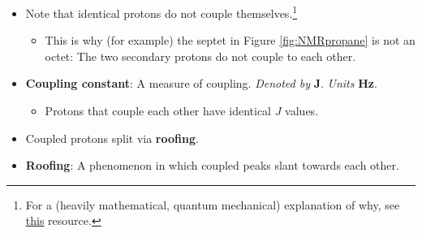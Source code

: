 \documentclass[../notes.tex]{subfiles}
\begin{document}
\begin{itemize}
\begin{itemize}
\begin{itemize}
        \end{itemize}
    \end{itemize}
    \item Note that identical protons do not couple themselves.\footnote{For a (heavily mathematical, quantum mechanical) explanation of why, see \href{https://chem.libretexts.org/Bookshelves/Physical_and_Theoretical_Chemistry_Textbook_Maps/Physical_Chemistry_(LibreTexts)/14\%3A_Nuclear_Magnetic_Resonance_Spectroscopy/14.07\%3A_Spin-Spin_Coupling_Between_Chemically_Equivalent_Protons_is_Not_Observed}{this} resource.}
    \begin{itemize}
        \item This is why (for example) the septet in Figure \ref{fig:NMRpropane} is not an octet: The two secondary protons do not couple to each other.
    \end{itemize}
    \item \textbf{Coupling constant}: A measure of coupling. \emph{Denoted by} $\bm{J}$. \emph{Units} \textbf{Hz}.
    \begin{itemize}
        \item Protons that couple each other have identical $J$ values.
    \end{itemize}
    \item Coupled protons split via \textbf{roofing}.
    \item \textbf{Roofing}: A phenomenon in which coupled peaks slant towards each other.
    \begin{figure}[h!]
        \centering
\end{figure}
\end{itemize}
\end{document}
